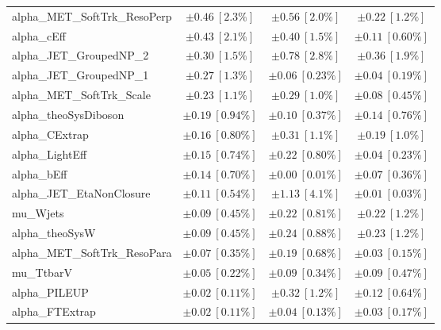 \begin{table}
\begin{center}
\begin{tabular*}{\textwidth}{@{\extracolsep{\fill}}lccc}
alpha\_MET\_SoftTrk\_ResoPerp         & $\pm 0.46\ [2.3\%] $          & $\pm 0.56\ [2.0\%] $          & $\pm 0.22\ [1.2\%] $       \\
alpha\_cEff         & $\pm 0.43\ [2.1\%] $          & $\pm 0.40\ [1.5\%] $          & $\pm 0.11\ [0.60\%] $       \\
alpha\_JET\_GroupedNP\_2         & $\pm 0.30\ [1.5\%] $          & $\pm 0.78\ [2.8\%] $          & $\pm 0.36\ [1.9\%] $       \\
alpha\_JET\_GroupedNP\_1         & $\pm 0.27\ [1.3\%] $          & $\pm 0.06\ [0.23\%] $          & $\pm 0.04\ [0.19\%] $       \\
alpha\_MET\_SoftTrk\_Scale         & $\pm 0.23\ [1.1\%] $          & $\pm 0.29\ [1.0\%] $          & $\pm 0.08\ [0.45\%] $       \\
alpha\_theoSysDiboson         & $\pm 0.19\ [0.94\%] $          & $\pm 0.10\ [0.37\%] $          & $\pm 0.14\ [0.76\%] $       \\
alpha\_CExtrap         & $\pm 0.16\ [0.80\%] $          & $\pm 0.31\ [1.1\%] $          & $\pm 0.19\ [1.0\%] $       \\
alpha\_LightEff         & $\pm 0.15\ [0.74\%] $          & $\pm 0.22\ [0.80\%] $          & $\pm 0.04\ [0.23\%] $       \\
alpha\_bEff         & $\pm 0.14\ [0.70\%] $          & $\pm 0.00\ [0.01\%] $          & $\pm 0.07\ [0.36\%] $       \\
alpha\_JET\_EtaNonClosure         & $\pm 0.11\ [0.54\%] $          & $\pm 1.13\ [4.1\%] $          & $\pm 0.01\ [0.03\%] $       \\
mu\_Wjets         & $\pm 0.09\ [0.45\%] $          & $\pm 0.22\ [0.81\%] $          & $\pm 0.22\ [1.2\%] $       \\
alpha\_theoSysW         & $\pm 0.09\ [0.45\%] $          & $\pm 0.24\ [0.88\%] $          & $\pm 0.23\ [1.2\%] $       \\
alpha\_MET\_SoftTrk\_ResoPara         & $\pm 0.07\ [0.35\%] $          & $\pm 0.19\ [0.68\%] $          & $\pm 0.03\ [0.15\%] $       \\
mu\_TtbarV         & $\pm 0.05\ [0.22\%] $          & $\pm 0.09\ [0.34\%] $          & $\pm 0.09\ [0.47\%] $       \\
alpha\_PILEUP         & $\pm 0.02\ [0.11\%] $          & $\pm 0.32\ [1.2\%] $          & $\pm 0.12\ [0.64\%] $       \\
alpha\_FTExtrap         & $\pm 0.02\ [0.11\%] $          & $\pm 0.04\ [0.13\%] $          & $\pm 0.03\ [0.17\%] $       \\

\end{tabular*}
\end{center}
\end{table}
